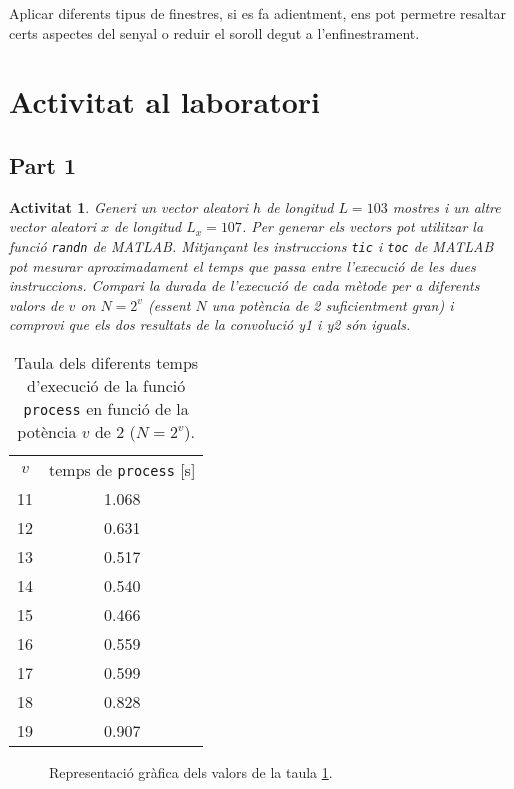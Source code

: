 \documentclass[11pt,a4]{article}
\numberwithin{equation}{section}
\theoremstyle{thmstyle}
\theoremstyle{thmstyle}
\theoremstyle{thmstyle}
\theoremstyle{thmstyle}
\theoremstyle{thmstyle}
\theoremstyle{thmstyle}
\theoremstyle{thmstyle}
\newtheorem{activity}{Activitat}
\begin{document}
Aplicar diferents tipus de finestres, si es fa adientment, ens pot permetre resaltar certs aspectes del senyal o reduir el soroll degut a l'enfinestrament.

\section{Activitat al laboratori}

\subsection{Part 1}

\begin{activity}
Generi un vector aleatori $h$ de longitud $L=103$ mostres i un altre vector aleatori $x$ de longitud $L_x=107$. Per generar els vectors pot utilitzar la funció {\tt randn} de MATLAB. Mitjançant les instruccions {\tt tic} i {\tt toc} de MATLAB pot mesurar aproximadament el temps que passa entre l’execució de les dues instruccions. Compari la durada de l’execució de cada mètode per a diferents valors de $v$ on $N=2^v$ (essent $N$ una potència de 2 suficientment gran) i comprovi que els dos resultats de la convolució y1 i y2 són iguals.
\end{activity}

\begin{table}
\centering
\begin{tabular}{|c|c|}
\hline
$v$       & temps de {\tt process} [s]  \\
11        & 1.068             \\
12        & 0.631             \\
13        & 0.517             \\
14        & 0.540             \\
15        & 0.466             \\
16        & 0.559             \\
17        & 0.599             \\
18        & 0.828             \\
19        & 0.907             \\
\hline
\end{tabular}
\caption{Taula dels diferents temps d'execució de la funció {\tt process} en funció de la potència $v$ de 2 ($N = 2^v$).}
\label{tb:temps}
\end{table}

\begin{figure}[h]
\centering
{}
\caption{Representació gràfica dels valors de la taula \ref{tb:temps}. }
\end{figure}
\end{document}
